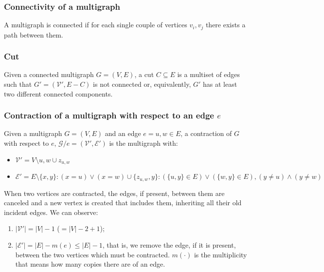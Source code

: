 \subsubsection*{Connectivity of a multigraph}
A multigraph is connected if for each single couple of vertices $v_i, v_j$ there exists a path between them.

\subsubsection*{Cut}
Given a connected multigraph $G = (V, E)$, a cut $C \subseteq E$ is a multiset of edges such that $G' = (\mathcal{V}', E-C)$ is not connected or, equivalently, $G'$ has at least two different connected components.

\subsubsection*{Contraction of a multigraph with respect to an edge $e$}
\label{definition_contraction}
Given a multigraph $G = (V, E)$ and an edge $e={u,w} \in E$, a contraction of $G$ with respect to $e$,  $\mathcal{G}/e=(\mathcal{V}', \mathcal{E}')$ is the multigraph with:
\begin{itemize}
    \item[] $\mathcal{V}' = V \setminus u,  w  \cup z_{u,w}$
    \item[] $\mathcal{E}' = E \setminus \{x, y\}: (x=u) \vee (x=w) \cup \{z_{u,w}, y\}: (\{u,y\} \in E) \vee (\{w,y\} \in E), (y\neq u) \wedge (y \neq w)$
\end{itemize}
\noindent
When two vertices are contracted, the edges, if present, between them are canceled and a new vertex is created that includes them, inheriting all their old incident edges. We can observe:
\begin{enumerate}
    \item $|\mathcal{V}'| = |V| - 1$ ($= |V| - 2 + 1$);
    \item $|\mathcal{E}'| = |E| - m(e) \le |E| - 1$, that is, we remove the edge,  if it is present, between the two vertices which must be contracted. $m(\cdot)$ is the multiplicity that means how many copies there are of an edge.
\end{enumerate}


